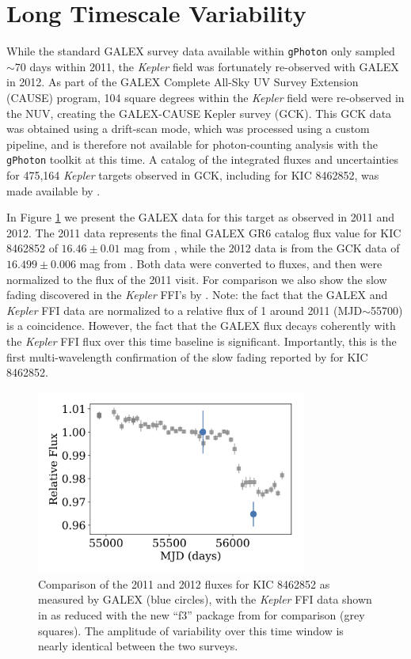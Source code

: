 \documentclass[twocolumn]{aastex6}
\newcommand{\Kepler}{\textsl{Kepler}\xspace}
\begin{document}
\section{Long Timescale Variability}
\label{sec:long}


While the standard GALEX survey data available within {\tt gPhoton} only sampled $\sim$70 days within 2011, the \Kepler field was fortunately re-observed with GALEX in 2012. As part of the GALEX Complete All-Sky UV Survey Extension (CAUSE) program, 104 square degrees within the \Kepler field were re-observed in the NUV, creating the GALEX-CAUSE Kepler survey (GCK). This GCK data was obtained using a drift-scan mode, which was processed using a custom pipeline, and is therefore not available for photon-counting analysis with the {\tt gPhoton} toolkit at this time. A catalog of the integrated fluxes and uncertainties for 475,164 \Kepler targets observed in GCK, including for KIC 8462852, was made available by \citet{olmedo2015}.


In Figure \ref{fig:longtime} we present the GALEX data for this target as observed in 2011 and 2012. The 2011 data represents the final GALEX GR6 catalog flux value for KIC 8462852 of $16.46 \pm 0.01$ mag from \citet{bianchi2014}, while the 2012 data is from the GCK data of $16.499\pm0.006$ mag from \citet{olmedo2015}. Both data were converted to fluxes, and then were normalized to the flux of the 2011 visit. For comparison we also show the slow fading discovered in the \Kepler FFI's by \citet{montet2016}. Note: the fact that the GALEX and \Kepler FFI data are normalized to a relative flux of 1 around 2011 (MJD$\sim$55700) is a coincidence. However, the fact that the GALEX flux decays coherently with the \Kepler FFI flux over this time baseline is significant. Importantly, this is the first multi-wavelength confirmation of the slow fading reported by \citet{montet2016} for KIC 8462852.



\begin{figure}[!t]
\centering
\includegraphics[width=3.5in]{KIC8462852_compare}
\caption{
Comparison of the 2011 and 2012 fluxes for KIC 8462852 as measured by GALEX (blue circles), with the \Kepler FFI data shown in \citet{montet2016} as reduced with the new ``f3'' package from \citet{montet2017} for comparison (grey squares). The amplitude of variability over this time window is nearly identical between the two surveys.
}
\label{fig:longtime}
\end{figure}
\end{document}
